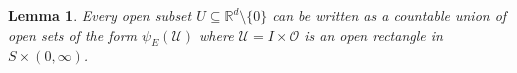 \documentclass[11pt]{article}
\newtheorem{lemma}[theorem]{Lemma}
\begin{document}

\begin{lemma}\label{lem:OpenRectangle}
Every open subset $U\subseteq \mathbb{R}^d\setminus\{0\}$ can be written as a countable union of open sets of the form $\psi_E(\mathcal{U})$ where $\mathcal{U}=I\times\mathcal{O}$ is an open rectangle in $S\times(0,\infty)$.
\end{lemma}
\end{document}
